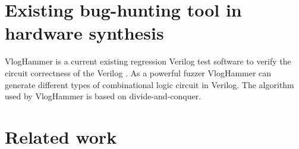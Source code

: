 \section{Existing bug-hunting tool in hardware synthesis}
VlogHammer is a current existing regression Verilog test software to verify the circuit correctness of the Verilog \cite{wolf2016yosys}. As a powerful fuzzer VlogHammer can generate different types of combinational logic circuit in Verilog. The algorithm used by VlogHammer is based on divide-and-conquer.

\section{Related work}
